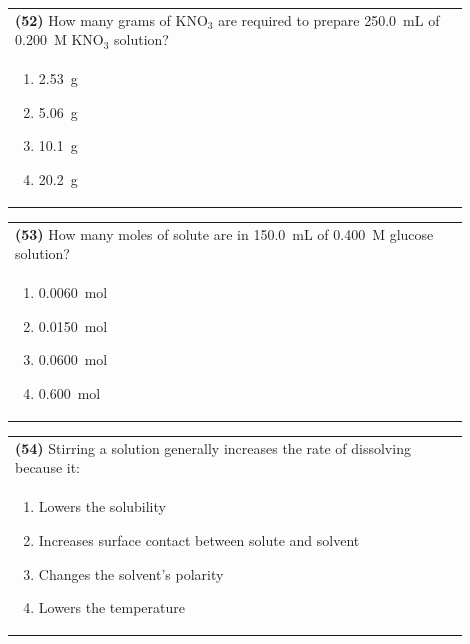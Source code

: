 \documentclass{article}
\begin{document}
\noindent\begin{tabular}{|p{0.9\linewidth}|}
\hline
\textbf{(52)} How many grams of KNO$_3$ are required to prepare 250.0~mL of 0.200~M KNO$_3$ solution?\\[0.2cm]
\begin{minipage}[t]{0.85\linewidth}
\begin{enumerate}[label=\alph*.]
\item 2.53~g
\item 5.06~g
\item 10.1~g
\item 20.2~g
\end{enumerate}
\end{minipage}\\[0.2cm]
\hline
\end{tabular}
\newpage

\noindent\begin{tabular}{|p{0.9\linewidth}|}
\hline
\textbf{(53)} How many moles of solute are in 150.0~mL of 0.400~M glucose solution?\\[0.2cm]
\begin{minipage}[t]{0.85\linewidth}
\begin{enumerate}[label=\alph*.]
\item 0.0060~mol
\item 0.0150~mol
\item 0.0600~mol
\item 0.600~mol
\end{enumerate}
\end{minipage}\\[0.2cm]
\hline
\end{tabular}

\noindent\begin{tabular}{|p{0.9\linewidth}|}
\hline
\textbf{(54)} Stirring a solution generally increases the rate of dissolving because it:\\[0.2cm]
\begin{minipage}[t]{0.85\linewidth}
\begin{enumerate}[label=\alph*.]
\item Lowers the solubility
\item Increases surface contact between solute and solvent
\item Changes the solvent's polarity
\item Lowers the temperature
\end{enumerate}
\end{minipage}\\[0.2cm]
\hline
\end{tabular}
\end{document}
